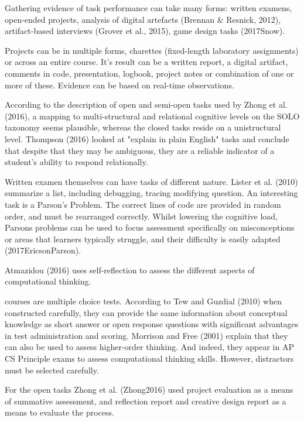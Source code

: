 Gathering evidence of task performance can take many forms: written examens, open-ended projects, analysis of digital artefacts (Brennan \& Resnick, 2012), artifact-based interviews (Grover et al., 2015), game design tasks (2017Snow).


Projects can be in multiple forms, charettes (fixed-length laboratory assignments) or across an entire course. It's result can be a written report, a digital artifact, comments in code, presentation, logbook, project notes or combination of one or more of these. Evidence can be based on real-time observations.

According to the description of open and semi-open tasks used by Zhong et al. (2016), a mapping to multi-structural and relational cognitive levels on the SOLO taxonomy seems plausible, whereas the closed tasks reside on a unistructural level. Thompson (2016) looked at "explain in plain English" tasks and conclude that despite that they may be ambiguous, they are a reliable indicator of a student’s ability to respond relationally.


Written examen themselves can have tasks of different nature. Lister et al. (2010) summarize a list, including debugging, tracing modifying question. An interesting task is a Parson's Problem. The correct lines of code are provided in random order, and must be rearranged correctly. Whilst lowering the cognitive load, Parsons problems can be used to focus assessment specifically on misconceptions or areas that learners typically struggle, and their difficulty is easily adapted (2017EricsonParson).

Atmazidou (2016) uses self-reflection to assess the different aspects of computational thinking.

courses are multiple choice tests. According to Tew and Guzdial (2010) when constructed carefully, they can provide the same information about conceptual knowledge as short answer or open response questions with significant advantages in test administration and scoring. Morrison and Free (2001) explain that they can also be used to assess higher-order thinking. And indeed, they appear in AP CS Principle exams to assess computational thinking skills. However, distractors must be selected carefully.


For the open tasks Zhong et al. (Zhong2016) used project evaluation as a means of summative assessment, and reflection report and creative design report as a means to evaluate the process.




